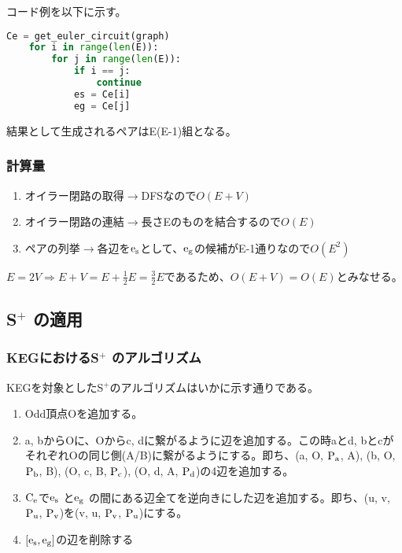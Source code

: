 \documentclass[11pt,a4j]{jarticle}
\newcommand{\splus}{S${}^\text{+}$}
\newcommand{\f}[1]{$\rm{#1}$} %
\newcommand{\ra }{$\rightarrow$}
\newcommand{\tops}[2]{\texorpdfstring{#1}{#2}} %
\begin{document}
コード例を以下に示す。

\begin{center}
    \begin{lstlisting}[language=Python]
    Ce = get_euler_circuit(graph)
    for i in range(len(E)):
        for j in range(len(E)):
            if i == j:
                continue
            es = Ce[i]
            eg = Ce[j]
    \end{lstlisting}
\end{center}
結果として生成されるペアはE(E-1)組となる。

\subsubsection{計算量}
\begin{enumerate}
    \item オイラー閉路の取得\ra DFSなので$O(E+V)$
    \item オイラー閉路の連結\ra 長さEのものを結合するので$O(E)$
    \item ペアの列挙\ra 各辺を\f{e_s}として、\f{e_g}の候補がE-1通りなので$O(E^2)$
\end{enumerate}
$E=2V \Rightarrow E+V=E+\frac{1}{2}E=\frac{3}{2}E$であるため、$O(E+V)=O(E)$とみなせる。

\subsection{\tops{\splus}{S+} の適用}

\subsubsection{KEGにおける\tops{\splus}{S+} のアルゴリズム}
KEGを対象とした\splus のアルゴリズムはいかに示す通りである。
\begin{enumerate}
    \item Odd頂点Oを追加する。
    \item a, bからOに、Oからc, dに繋がるように辺を追加する。この時aとd, bとcがそれぞれOの同じ側(A/B)に繋がるようにする。即ち、(a, O, \f{P_a}, A), (b, O, \f{P_b}, B), (O, c, B, \f{P_c}), (O, d, A, \f{P_d})の4辺を追加する。
    \item \f{C_e}で\f{e_s} と\f{e_g} の間にある辺全てを逆向きにした辺を追加する。即ち、(u, v, \f{P_u}, \f{P_v})を(v, u, \f{P_v}, \f{P_u})にする。
    \item $[\rm{e_s}, \rm{e_g}]$の辺を削除する
\end{enumerate}
\end{document}
